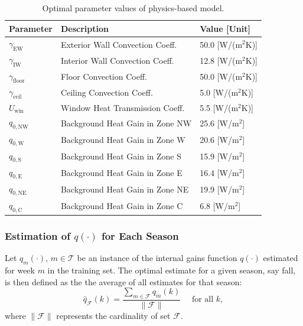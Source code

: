 \begin{table}[b]
	\centering
	\begin{tabular}{l l l}
	\toprule
	Parameter & Description & Value [Unit]\\
	\hline
	$\gamma_{\text{EW}}$ & Exterior Wall Convection Coeff. & 50.0  [W/(m$^2$K)]\\
	$\gamma_{\text{IW}}$ & Interior Wall Convection Coeff. & 12.8  [W/(m$^2$K)]\\
	$\gamma_{\text{floor}}$ & Floor Convection Coeff. & 50.0  [W/(m$^2$K)]\\
	$\gamma_{\text{ceil}}$ & Ceiling Convection Coeff. & 5.0  [W/(m$^2$K)]\\
	$U_{\text{win}}$ & Window Heat Transmission Coeff. & 5.5  [W/(m$^2$K)]\\
	$q_{0,\text{NW}}$ & Background Heat Gain in Zone NW  & 25.6  [W/m$^2$]\\
	$q_{0,\text{W}}$ & Background Heat Gain in Zone W  & 20.6  [W/m$^2$]\\
	$q_{0,\text{S}}$ & Background Heat Gain in Zone S  & 15.9  [W/m$^2$]\\
	$q_{0,\text{E}}$ & Background Heat Gain in Zone E  & 16.4  [W/m$^2$]\\
	$q_{0,\text{NE}}$ & Background Heat Gain in Zone NE  & 19.9  [W/m$^2$]\\
	$q_{0,\text{C}}$ & Background Heat Gain in Zone C  & 6.8  [W/m$^2$]\\			
	\bottomrule
	\end{tabular}
	\caption{Optimal parameter values of physics-based model.}
	\label{table:param}
\end{table}

\vspace*{0.2cm}
\subsubsection{Estimation of $q(\cdot)$ for Each Season}
Let $q_{m}(\cdot)$, $m \in \mathcal{T}$ be an instance of the internal gains function $q(\cdot)$ estimated for week $m$ in the training set. 
The optimal estimate for a given season, say fall, is then defined as the the average of all estimates for that season:
\begin{equation}
\hat {q}_{\mathcal{F}}(k) = \frac{\textstyle \sum_{m \in \mathcal{F}} q_m(k)}{\| \mathcal{F} \| }\quad \text{ for all $k$},
\end{equation}
where $\| \mathcal{F} \| $ represents the cardinality of set $\mathcal{F}$.

